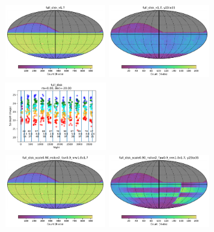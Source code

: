 \documentclass[modern]{aastex62}
\begin{document}
\begin{figure}
\includegraphics[height=1.25in, width=1.75in]{plots/full_disk_v1.7/full_disk_v1_7_Count_HEAL_SkyMap.pdf}
\includegraphics[height=1.25in, width=1.75in]{plots/full_disk_v1.7/full_disk_v1_7_Count_night_gt_913_125000_and_night_lt_1278_375000_and_note_not_like_DD_HEAL_SkyMap.pdf}
\includegraphics[height=1.25in, width=1.75in]{plots/full_disk_v17_spotc.pdf} \\
\includegraphics[height=1.25in, width=1.75in]{plots/full_disk_scale0.90_nslice2_fpw0.9_nrw1.0v1.7/full_disk_scale0_90_nslice2_fpw0_9_nrw1_0v1_7_Count_HEAL_SkyMap.pdf}
\includegraphics[height=1.25in, width=1.75in]{plots/full_disk_scale0.90_nslice2_fpw0.9_nrw1.0v1.7/full_disk_scale0_90_nslice2_fpw0_9_nrw1_0v1_7_Count_night_gt_913_125000_and_night_lt_1278_375000_and_note_not_like_DD_HEAL_SkyMap.pdf}

\end{figure}
\end{document}
